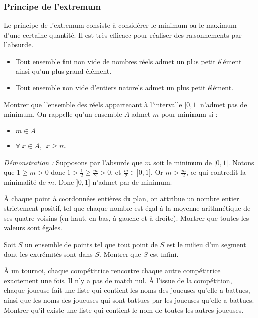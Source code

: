 \subsubsection{Principe de l'extremum}
Le principe de l'extremum consiste à considérer le minimum ou le maximum d’une certaine quantité. Il est très efficace pour réaliser des raisonnements par l’absurde.

\begin{thm}
\begin{itemize}
    \item Tout ensemble fini non vide de nombres réels admet un plus petit élément ainsi qu’un plus grand élément.
    \item Tout ensemble non vide d'entiers naturels admet un plus petit élément.
\end{itemize}
\end{thm}


\begin{ex}
Montrer que l'ensemble des réels appartenant à l'intervalle $]0,1]$ n'admet pas de minimum. \newline
On rappelle qu'un ensemble $A$ admet $m$ pour minimum si :
\begin{itemize}
\item $m\in A$
\item $\forall~ x\in A, ~~ x\ge m$.
\end{itemize}
\bigskip
\noindent\textit{Démonstration :} Supposons par l'absurde que $m$ soit le minimum de $]0,1]$. \newline
Notons que $1\ge m>0$ donc $1>\frac12\ge\frac{m}{2}>0$, et $\frac{m}{2}\in]0,1]$. Or $m>\frac{m}{2}$, ce qui contredit la minimalité de $m$. Donc $]0,1]$ n'admet par de minimum.
\end{ex}


\begin{exo}
À chaque point à coordonnées entières du plan, on attribue un nombre entier strictement positif, tel que chaque nombre est égal à la moyenne arithmétique de ses quatre voisins
(en haut, en bas, à gauche et à droite). Montrer que toutes les valeurs sont égales.
\end{exo}


\begin{exo}
Soit $S$ un ensemble de points tel que tout point de $S$ est le milieu d’un segment dont les extrémités sont dans $S$. Montrer que $S$ est infini.
\end{exo}


\begin{exo}
À un tournoi, chaque compétitrice rencontre chaque autre compétitrice exactement une fois. Il n’y a pas de match nul. À l’issue de la compétition, chaque joueuse fait une liste qui contient les noms des joueuses qu’elle a battues, ainsi que les noms des joueuses qui sont battues par les joueuses qu’elle a battues.
\newline
Montrer qu’il existe une liste qui contient le nom de toutes les autres joueuses.
\end{exo}

